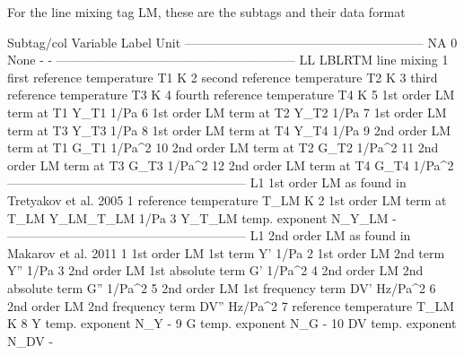 For the line mixing tag LM, these are the subtags and their data format
\begin{code}    
Subtag/col  Variable                        Label    Unit
---------------------------------------------------------
       NA
        0  None                                 -       -
---------------------------------------------------------
       LL  LBLRTM line mixing
        1  first reference temperature         T1       K
        2  second reference temperature        T2       K
        3  third reference temperature         T3       K
        4  fourth reference temperature        T4       K
        5  1st order LM term at T1           Y_T1    1/Pa
        6  1st order LM term at T2           Y_T2    1/Pa
        7  1st order LM term at T3           Y_T3    1/Pa
        8  1st order LM term at T4           Y_T4    1/Pa
        9  2nd order LM term at T1           G_T1  1/Pa^2
       10  2nd order LM term at T2           G_T2  1/Pa^2
       11  2nd order LM term at T3           G_T3  1/Pa^2
       12  2nd order LM term at T4           G_T4  1/Pa^2
---------------------------------------------------------
       L1  1st order LM as found in Tretyakov et al. 2005
        1  reference temperature             T_LM       K
        2  1st order LM term at T_LM    Y_LM_T_LM    1/Pa
        3  Y_T_LM temp. exponent           N_Y_LM       -
---------------------------------------------------------
       L1  2nd order LM as found in Makarov et al. 2011
        1  1st order LM 1st term               Y'    1/Pa
        2  1st order LM 2nd term              Y''    1/Pa
        3  2nd order LM 1st absolute term      G'  1/Pa^2
        4  2nd order LM 2nd absolute term     G''  1/Pa^2
        5  2nd order LM 1st frequency term    DV' Hz/Pa^2
        6  2nd order LM 2nd frequency term   DV'' Hz/Pa^2
        7  reference temperature             T_LM       K
        8  Y  temp. exponent                  N_Y       -
        9  G  temp. exponent                  N_G       -
        10 DV temp. exponent                 N_DV       -
\end{code}

